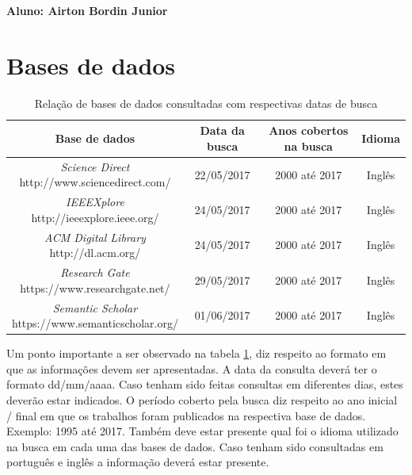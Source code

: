 \documentclass[a4paper,11pt]{article}
\begin{document}

\begin{framed}
\begin{center}
\textbf{Aluno: Airton Bordin Junior}
\end{center}
\end{framed}

\section{Bases de dados}
\begin{table}[ht]
\centering
\begin{tabular}{| c | c | c | c |}
\hline
\textbf{Base de dados} &  \textbf{Data da busca} & \textbf{Anos cobertos na busca} & \textbf{Idioma} \\
\hline
\makecell{\emph{Science Direct} \\ http://www.sciencedirect.com/} & 22/05/2017 & 2000 até 2017 & Inglês \\
\hline
\makecell{\emph{IEEEXplore} \\ http://ieeexplore.ieee.org/} & 24/05/2017 & 2000 até 2017 & Inglês \\
\hline
\makecell{\emph{ACM Digital Library} \\http://dl.acm.org/} & 24/05/2017 & 2000 até 2017 & Inglês \\
\hline
\makecell{\emph{Research Gate} \\ https://www.researchgate.net/} & 29/05/2017 & 2000 até 2017 & Inglês \\
\hline
\makecell{\emph{Semantic Scholar} \\ https://www.semanticscholar.org/} & 01/06/2017 & 2000 até 2017 & Inglês \\
\hline

\end{tabular}
\caption{Relação de bases de dados consultadas com respectivas datas de busca}
\label{tab:tab_bases}
\end{table}

Um ponto importante a ser observado na tabela \ref{tab:tab_bases}, diz respeito ao formato em que as informações devem ser apresentadas. A data da consulta deverá ter o formato dd/mm/aaaa. Caso tenham sido feitas consultas em diferentes dias, estes deverão estar indicados. O período coberto pela busca diz respeito ao ano inicial / final em que os trabalhos foram publicados na respectiva base de dados. Exemplo: 1995 até 2017. Também deve estar presente qual foi o idioma utilizado na busca em cada uma das bases de dados. Caso tenham sido consultadas em português e inglês a informação deverá estar presente.
\end{document}
